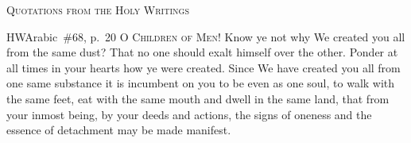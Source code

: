 \documentclass[14pt]{extarticle}
\begin{document}
\begin{center}
  {\LARGE \textsc{Quotations from the Holy Writings}}
\end{center}

\begin{hafez}{HW}{Arabic~\#68, p.~20}
  \lettrine{O}{ Children of Men}! Know ye not why We created you all from the
  same dust? That no one should exalt himself over the other. Ponder at all
  times in your hearts how ye were created. Since We have created you all from
  one same substance it is incumbent on you to be even as one soul, to walk
  with the same feet, eat with the same mouth and dwell in the same land, that
  from your inmost being, by your deeds and actions, the signs of oneness and
  the essence of detachment may be made manifest.
\end{hafez}
\end{document}
